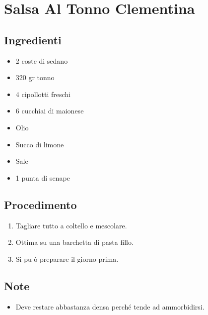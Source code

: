 \section{Salsa Al Tonno Clementina}
\subsection{Ingredienti}
\begin{itemize}
\item 2 coste di sedano  
\item 320 gr tonno  
\item 4 cipollotti freschi  
\item 6 cucchiai di maionese  
\item Olio  
\item Succo di limone  
\item Sale  
\item 1 punta di senape
\end{itemize}
\subsection{Procedimento}
\begin{enumerate}
\item  Tagliare tutto a coltello e mescolare.  
\item  Ottima su una barchetta di pasta fillo.  
\item  Si pu ò preparare il giorno prima.
\end{enumerate}
\subsection{Note}
\begin{itemize}
\item Deve restare abbastanza densa perché tende ad ammorbidirsi.
\end{itemize}

